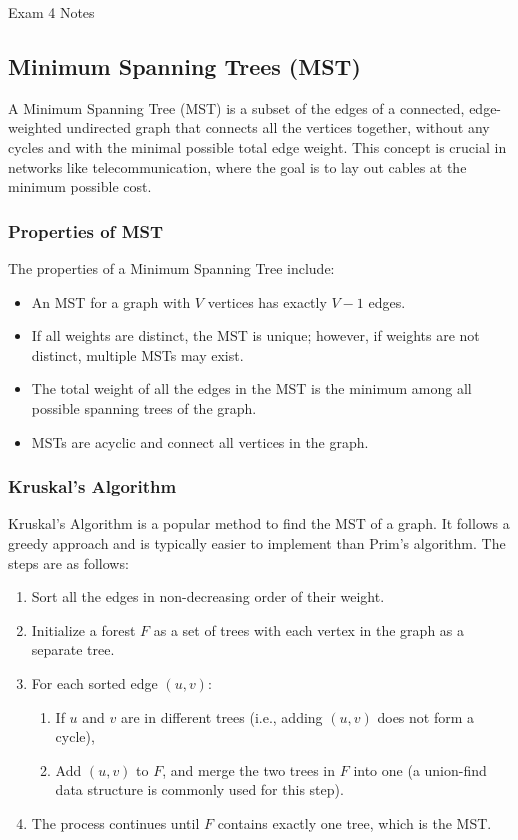 \begin{examnotes}{Exam 4 Notes}
    \subsection*{Minimum Spanning Trees (MST)}

    A Minimum Spanning Tree (MST) is a subset of the edges of a connected, edge-weighted undirected graph that connects all the vertices together, without any cycles and with the minimal possible total 
    edge weight. This concept is crucial in networks like telecommunication, where the goal is to lay out cables at the minimum possible cost.
    
    \subsubsection*{Properties of MST}
    
    The properties of a Minimum Spanning Tree include:
    \begin{itemize}
        \item An MST for a graph with $V$ vertices has exactly $V-1$ edges.
        \item If all weights are distinct, the MST is unique; however, if weights are not distinct, multiple MSTs may exist.
        \item The total weight of all the edges in the MST is the minimum among all possible spanning trees of the graph.
        \item MSTs are acyclic and connect all vertices in the graph.
    \end{itemize}
    
    \subsubsection*{Kruskal's Algorithm}
    
    Kruskal's Algorithm is a popular method to find the MST of a graph. It follows a greedy approach and is typically easier to implement than Prim's algorithm. The steps are as follows:
    
    \begin{enumerate}
        \item Sort all the edges in non-decreasing order of their weight.
        \item Initialize a forest $F$ as a set of trees with each vertex in the graph as a separate tree.
        \item For each sorted edge $(u, v)$:
        \begin{enumerate}
            \item If $u$ and $v$ are in different trees (i.e., adding $(u, v)$ does not form a cycle),
            \item Add $(u, v)$ to $F$, and merge the two trees in $F$ into one (a union-find data structure is commonly used for this step).
        \end{enumerate}
        \item The process continues until $F$ contains exactly one tree, which is the MST.
    \end{enumerate}
    

\end{examnotes}
